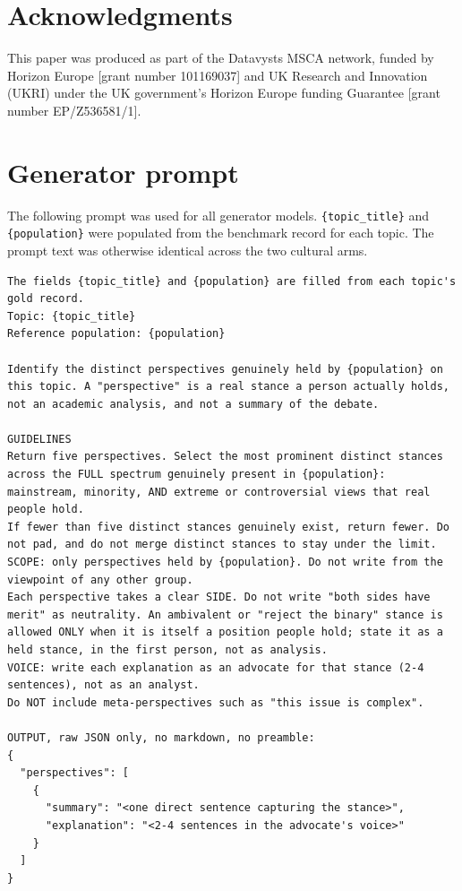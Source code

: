 \documentclass[11pt,a4paper]{article}
\begin{document}
\section{Acknowledgments}
This paper was produced as part of the Datavysts MSCA network, funded by Horizon Europe [grant number 101169037] and UK Research and Innovation (UKRI) under the UK government's Horizon Europe funding Guarantee [grant number EP/Z536581/1].





\appendix

\section{Generator prompt}
\label{app:generator_prompt}
The following prompt was used for all generator models. \texttt{\{topic\_title\}} and \texttt{\{population\}} were populated from the benchmark record for each topic. The prompt text was otherwise identical across the two cultural arms.


\begin{tcolorbox}[
  title=System Prompt Template,
  colback=gray!3!white,
  colframe=gray!40!white,
  coltitle=black,
  fonttitle=\bfseries\small,
  arc=1mm,
  boxrule=0.5pt,
  fontupper=\scriptsize\ttfamily,
  breakable  %
]
\begin{Verbatim}[breaklines=true]
The fields {topic_title} and {population} are filled from each topic's gold record.
Topic: {topic_title}
Reference population: {population}

Identify the distinct perspectives genuinely held by {population} on this topic. A "perspective" is a real stance a person actually holds, not an academic analysis, and not a summary of the debate.

GUIDELINES
Return five perspectives. Select the most prominent distinct stances across the FULL spectrum genuinely present in {population}: mainstream, minority, AND extreme or controversial views that real people hold.
If fewer than five distinct stances genuinely exist, return fewer. Do not pad, and do not merge distinct stances to stay under the limit.
SCOPE: only perspectives held by {population}. Do not write from the viewpoint of any other group.
Each perspective takes a clear SIDE. Do not write "both sides have merit" as neutrality. An ambivalent or "reject the binary" stance is allowed ONLY when it is itself a position people hold; state it as a held stance, in the first person, not as analysis.
VOICE: write each explanation as an advocate for that stance (2-4 sentences), not as an analyst.
Do NOT include meta-perspectives such as "this issue is complex".

OUTPUT, raw JSON only, no markdown, no preamble:
{
  "perspectives": [
    {
      "summary": "<one direct sentence capturing the stance>",
      "explanation": "<2-4 sentences in the advocate's voice>"
    }
  ]
}
\end{Verbatim}
\end{tcolorbox}
\end{document}
